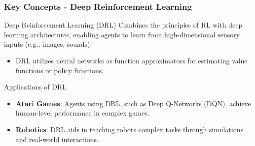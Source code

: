 \documentclass{beamer}
\begin{document}
\begin{frame}[fragile]
    \frametitle{Key Concepts - Deep Reinforcement Learning}
    
    \begin{block}{Deep Reinforcement Learning (DRL)}
    Combines the principles of RL with deep learning architectures, enabling agents to learn from high-dimensional sensory inputs (e.g., images, sounds).
    \end{block}
    
    \begin{itemize}
        \item DRL utilizes neural networks as function approximators for estimating value functions or policy functions.
    \end{itemize}
    
    \begin{block}{Applications of DRL}
        \begin{itemize}
            \item \textbf{Atari Games}: Agents using DRL, such as Deep Q-Networks (DQN), achieve human-level performance in complex games.
            \item \textbf{Robotics}: DRL aids in teaching robots complex tasks through simulations and real-world interactions.
        \end{itemize}
    \end{block}
\end{frame}
\end{document}

